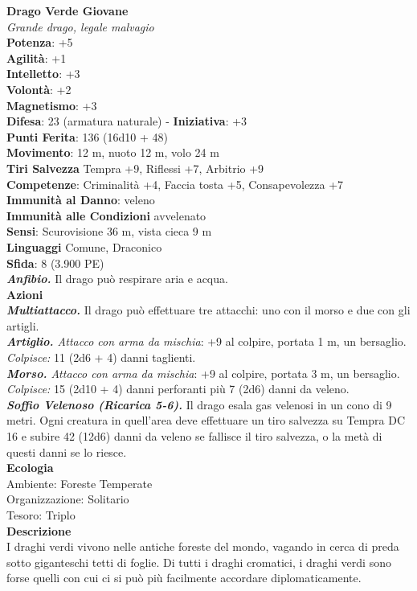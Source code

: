 \begin{multicols}{2}
\medskip\textbf{Drago Verde Giovane}\\
\emph{Grande drago, legale malvagio}\\
\textbf{Potenza}: +5\\
\textbf{Agilità}: +1\\
\textbf{Intelletto}: +3\\
\textbf{Volontà}: +2\\
\textbf{Magnetismo}: +3\\
\textbf{Difesa}: 23 (armatura naturale) - \textbf{Iniziativa}: +3\\
\textbf{Punti Ferita}: 136 (16d10 + 48)\\
\textbf{Movimento}: 12 m, nuoto 12 m, volo 24 m\\
\textbf{Tiri Salvezza} Tempra +9, Riflessi +7, Arbitrio +9\\
\textbf{Competenze}: Criminalità +4, Faccia tosta +5, Consapevolezza +7\\
\textbf{Immunità al Danno}: veleno\\
\textbf{Immunità alle Condizioni} avvelenato\\
\textbf{Sensi}: Scurovisione 36 m, vista cieca 9 m \\
\textbf{Linguaggi} Comune, Draconico\\
\textbf{Sfida}: 8 (3.900 PE)\smallskip\\
\emph{\textbf{Anfibio.}} Il drago può respirare aria e acqua. \\
\smallskip\textbf{Azioni}\\
\emph{\textbf{Multiattacco.}} Il drago può effettuare tre attacchi: uno con il morso e due con gli artigli.\\
\emph{\textbf{Artiglio.} Attacco con arma da mischia}: +9 al colpire, portata 1 m, un bersaglio.\\
\emph{Colpisce:} 11 (2d6 + 4) danni taglienti.\\
\emph{\textbf{Morso.} Attacco con arma da mischia}: +9 al colpire, portata 3 m, un bersaglio.\\
\emph{Colpisce:} 15 (2d10 + 4) danni perforanti più 7 (2d6) danni da veleno.\\
\emph{\textbf{Soffio Velenoso (Ricarica 5-6).}} Il drago esala gas velenosi in un cono di 9 metri. Ogni creatura in quell'area deve effettuare un tiro salvezza su Tempra DC  16 e subire 42 (12d6) danni da veleno se fallisce il tiro salvezza, o la metà di questi danni se lo riesce.\\
\textbf{Ecologia}\\
Ambiente: Foreste Temperate\\
Organizzazione: Solitario\\
Tesoro: Triplo\\
\textbf{Descrizione}\\
I draghi verdi vivono nelle antiche foreste del mondo, vagando in cerca di preda sotto giganteschi tetti di foglie. Di tutti i draghi cromatici, i draghi verdi sono forse quelli con cui ci si può più facilmente accordare diplomaticamente.\\


\end{multicols}
